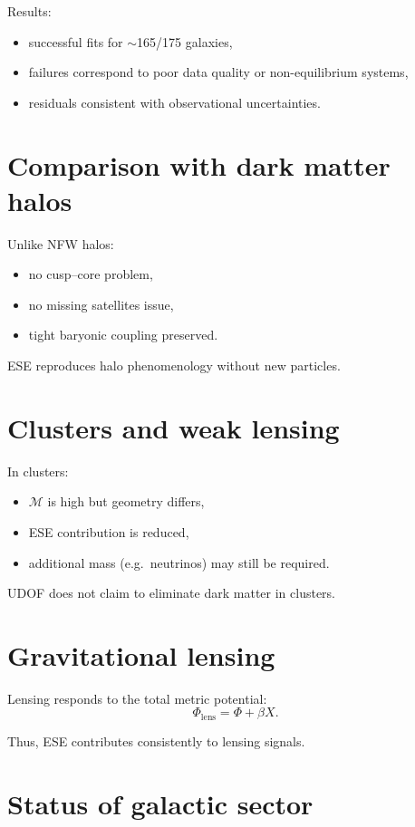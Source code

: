 \documentclass[11pt]{book}
\begin{document}
Results:
\begin{itemize}
\item successful fits for $\sim$165/175 galaxies,
\item failures correspond to poor data quality or non-equilibrium systems,
\item residuals consistent with observational uncertainties.
\end{itemize}

\section{Comparison with dark matter halos}

Unlike NFW halos:
\begin{itemize}
\item no cusp--core problem,
\item no missing satellites issue,
\item tight baryonic coupling preserved.
\end{itemize}

ESE reproduces halo phenomenology without new particles.

\section{Clusters and weak lensing}

In clusters:
\begin{itemize}
\item $\mathcal{M}$ is high but geometry differs,
\item ESE contribution is reduced,
\item additional mass (e.g.\ neutrinos) may still be required.
\end{itemize}

UDOF does not claim to eliminate dark matter in clusters.

\section{Gravitational lensing}

Lensing responds to the total metric potential:
\begin{equation}
\Phi_{\mathrm{lens}} = \Phi + \beta X.
\end{equation}

Thus, ESE contributes consistently to lensing signals.

\section{Status of galactic sector}
\end{document}

